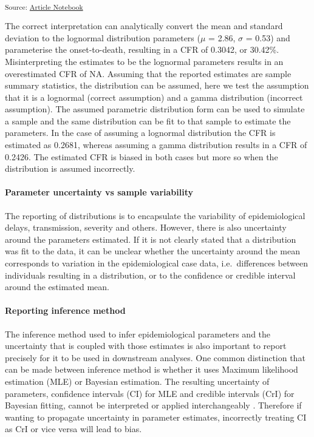 \documentclass[
  10pt,
  letterpaper,
]{article}
\begin{document}
\begin{tcolorbox}[enhanced jigsaw, rightrule=.15mm, toprule=.15mm, colframe=quarto-callout-tip-color-frame, arc=.35mm, leftrule=.75mm, opacityback=0, bottomrule=.15mm, breakable, left=2mm, colback=white]
\textsubscript{Source:
\href{https://joshwlambert.github.io/epiparameterReportingGuidance/index.qmd.html}{Article
Notebook}}

The correct interpretation can analytically convert the mean and
standard deviation to the lognormal distribution parameters (\(\mu\) =
2.86, \(\sigma\) = 0.53) and parameterise the onset-to-death, resulting
in a CFR of 0.3042, or 30.42\%. Misinterpreting the estimates to be the
lognormal parameters results in an overestimated CFR of NA. Assuming
that the reported estimates are sample summary statistics, the
distribution can be assumed, here we test the assumption that it is a
lognormal (correct assumption) and a gamma distribution (incorrect
assumption). The assumed parametric distribution form can be used to
simulate a sample and the same distribution can be fit to that sample to
estimate the parameters. In the case of assuming a lognormal
distribution the CFR is estimated as 0.2681, whereas assuming a gamma
distribution results in a CFR of 0.2426. The estimated CFR is biased in
both cases but more so when the distribution is assumed incorrectly.

\end{tcolorbox}

\paragraph{Parameter uncertainty vs sample
variability}\label{parameter-uncertainty-vs-sample-variability}

The reporting of distributions is to encapsulate the variability of
epidemiological delays, transmission, severity and others. However,
there is also uncertainty around the parameters estimated. If it is not
clearly stated that a distribution was fit to the data, it can be
unclear whether the uncertainty around the mean corresponds to variation
in the epidemiological case data, i.e.~differences between individuals
resulting in a distribution, or to the confidence or credible interval
around the estimated mean.

\paragraph{Reporting inference method}\label{reporting-inference-method}

The inference method used to infer epidemiological parameters and the
uncertainty that is coupled with those estimates is also important to
report precisely for it to be used in downstream analyses. One common
distinction that can be made between inference method is whether it uses
Maximum likelihood estimation (MLE) or Bayesian estimation. The
resulting uncertainty of parameters, confidence intervals (CI) for MLE
and credible intervals (CrI) for Bayesian fitting, cannot be interpreted
or applied interchangeably \citep{moreyFallacyPlacingConfidence2016}.
Therefore if wanting to propagate uncertainty in parameter estimates,
incorrectly treating CI as CrI or vice versa will lead to bias.
\end{document}
